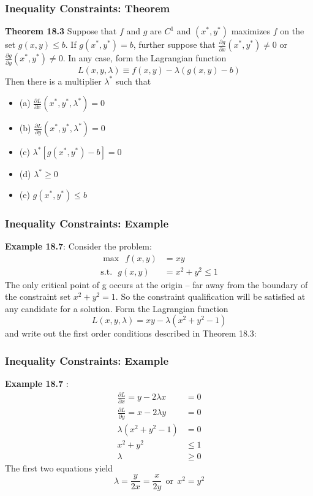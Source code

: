 \documentclass[9pt,aspectratio=169]{beamer}
\begin{document}
\begin{frame}
	\frametitle{Inequality Constraints: Theorem}
    \begin{block}{\textbf{Theorem 18.3}}
        Suppose that $f$ and $g$ are $C^1$ and $(x^*,y^*)$ maximizes $f$ on
        the set $g(x,y)\leq b$. If $g(x^*,y^*) = b$, further suppose that
        $\frac{\partial g}{\partial x}(x^*,y^*)\neq 0$ or $\frac{\partial
          g}{\partial y}(x^*,y^*)\neq 0$. In any case, form the Lagrangian
        function
        $$L(x,y,\lambda) \equiv f(x,y)-\lambda(g(x,y)-b)$$
        Then there is a multiplier $\lambda^*$ such that
        \begin{itemize}
            \item (a) $\frac{\partial L}{\partial x}(x^*,y^*,\lambda^*) = 0$
            \item (b) $\frac{\partial L}{\partial y}(x^*,y^*,\lambda^*) = 0$
            \item (c) $\lambda^*[g(x^*,y^*)-b] = 0$ 
            \item (d) $\lambda^* \geq 0$ 
            \item (e) $g(x^*,y^*) \leq b$
        \end{itemize}
    \end{block}
\end{frame}	


\begin{frame}
\frametitle{Inequality Constraints: Example}
\textbf{Example 18.7}: Consider the problem: 
\begin{align}
\max\ \ f(x,y) & = xy \nonumber \\
\text{s.t.}\ \ \ g(x,y) &= x^2+y^2 \leq 1 \nonumber 
\end{align}
The only critical point of g occurs at the origin -- far away from the boundary of the constraint set $x^2+y^2 = 1$.  So the constraint qualification will
be satisfied at any candidate for a solution. Form the Lagrangian function $$L(x,y,\lambda) = xy-\lambda(x^2+y^2-1)$$ 
and write out the first order conditions described
in Theorem 18.3: 
\end{frame}	


\begin{frame}
	\frametitle{Inequality Constraints: Example}
	\textbf{Example 18.7} : 
	\begin{align}
	\frac{\partial L}{\partial x}  = y-2\lambda x & = 0 \nonumber \\
	\frac{\partial L}{\partial y}  = x-2\lambda y & = 0 \nonumber \\
	\lambda(x^2+y^2-1) & = 0 \nonumber \\
	x^2+y^2 & \leq 1 \nonumber \\
	\lambda & \geq 0 \nonumber
	\end{align}
The first two equations yield
$$\lambda = \frac{y}{2x} = \frac{x}{2y} \ \ \text{or}\ \ x^2 = y^2$$
\end{frame}	
\end{document}
